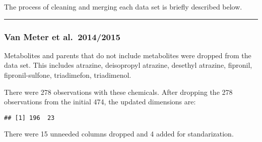 \documentclass[
]{article}
\newenvironment{Shaded}{\begin{snugshade}}{\end{snugshade}}
\newcommand{\CommentTok}[1]{\textcolor[rgb]{0.56,0.35,0.01}{\textit{#1}}}
\newcommand{\KeywordTok}[1]{\textcolor[rgb]{0.13,0.29,0.53}{\textbf{#1}}}
\newcommand{\NormalTok}[1]{#1}
\newcommand{\OperatorTok}[1]{\textcolor[rgb]{0.81,0.36,0.00}{\textbf{#1}}}
\newcommand{\StringTok}[1]{\textcolor[rgb]{0.31,0.60,0.02}{#1}}
\begin{document}
The process of cleaning and merging each data set is briefly described
below.

\begin{center}\rule{0.5\linewidth}{0.5pt}\end{center}

\hypertarget{van-meter-et-al.-20142015}{%
\subsubsection{Van Meter et
al.~2014/2015}\label{van-meter-et-al.-20142015}}

Metabolites and parents that do not include metabolites were dropped
from the data set. This includes atrazine, deisopropyl atrazine,
desethyl atrazine, fipronil, fipronil-sulfone, triadimefon, triadimenol.

\begin{Shaded}
\end{Shaded}

There were 278 observations with these chemicals. After dropping the 278
observations from the initial 474, the updated dimensions are:

\begin{verbatim}
## [1] 196  23
\end{verbatim}

There were 15 unneeded columns dropped and 4 added for standarization.
\end{document}
